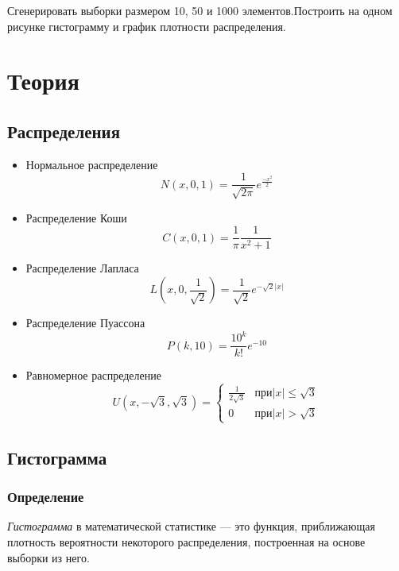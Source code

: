 \documentclass{article}
\begin{document}
\noindent Сгенерировать выборки размером 10, 50 и 1000 элементов.\newline Построить на одном рисунке гистограмму и график плотности распределения.

\section {Теория}

\subsection{Распределения}
	\begin{itemize}
		\item Нормальное распределение \begin{equation}
										  N(x, 0, 1) = \frac{1}{\sqrt{2\pi}}e^{\frac{-x^2}{2}} \label{norm} 
									   \end{equation}
		\item Распределение Коши \begin{equation}
									C(x, 0, 1) = \frac{1}{\pi}\frac{1}{x^2+1} \label{koshi}
								 \end{equation} 
		\item Распределение Лапласа \begin{equation}
									   L(x, 0, \frac{1}{\sqrt{2}}) = \frac{1}{\sqrt{2}}e^{-\sqrt{2}|x|} \label{laplace} 
									\end{equation}
		\item Распределение Пуассона \begin{equation}
										P(k, 10) = \frac{10^k}{k!}e^{-10}\label{puasson}
									 \end{equation}
		\item Равномерное распределение \begin{equation}
				U(x, -\sqrt{3}, \sqrt{3}) =
				\begin{cases}
					\frac{1}{2\sqrt{3}} &\text{$при |x|\leq \sqrt{3}$}\\
					0 &\text{$при |x|>\sqrt{3}$}
				\end{cases}
				\label{uni} 
			\end{equation}
	\end{itemize}

	\subsection{Гистограмма}
	\subsubsection{Определение}
	\noindent \textit{Гистограмма} в математической статистике — это функция, приближающая плотность вероятности некоторого распределения, построенная на основе выборки из него.
	
\end{document}
